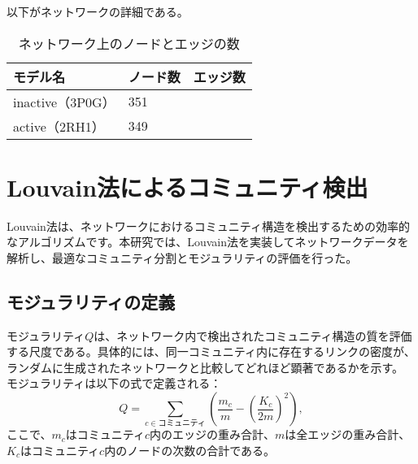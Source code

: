 以下がネットワークの詳細である。
\begin{table}[!ht]
    \centering
    \caption{ネットワーク上のノードとエッジの数}
    \begin{tabular}{lll}
      \hline
      モデル名          & ノード数  & エッジ数 \\
      \hline 
      inactive（3P0G）  &  351 &  \\ 
      active（2RH1）    &  349 &  \\ 
    \end{tabular}
    \label{tab:system_size}
  \end{table}



\section{Louvain法によるコミュニティ検出}

Louvain法は、ネットワークにおけるコミュニティ構造を検出するための効率的なアルゴリズムです。本研究では、Louvain法を実装してネットワークデータを解析し、最適なコミュニティ分割とモジュラリティの評価を行った。
\subsection{モジュラリティの定義}
モジュラリティ$Q$は、ネットワーク内で検出されたコミュニティ構造の質を評価する尺度である。具体的には、同一コミュニティ内に存在するリンクの密度が、ランダムに生成されたネットワークと比較してどれほど顕著であるかを示す。
モジュラリティは以下の式で定義される：
\begin{equation}
Q = \sum_{c \in \text{コミュニティ}} \left( \frac{m_c}{m} - \left( \frac{K_c}{2m} \right)^2 \right),
\end{equation}
ここで、$m_c$はコミュニティ$c$内のエッジの重み合計、$m$は全エッジの重み合計、$K_c$はコミュニティ$c$内のノードの次数の合計である。

